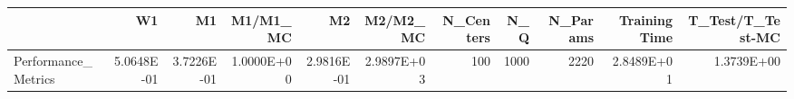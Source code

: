 \begin{tabular}{lrrrrrrrrrr}
\toprule
{} &         W1 &         M1 &   M1/M1\_MC &         M2 &   M2/M2\_MC &  N\_Centers &   N\_Q &  N\_Params &  Training Time &  T\_Test/T\_Test-MC \\
\midrule
Performance\_Metrics & 5.0648E-01 & 3.7226E-01 & 1.0000E+00 & 2.9816E-01 & 2.9897E+03 &        100 &  1000 &      2220 &     2.8489E+01 &        1.3739E+00 \\
\bottomrule
\end{tabular}
